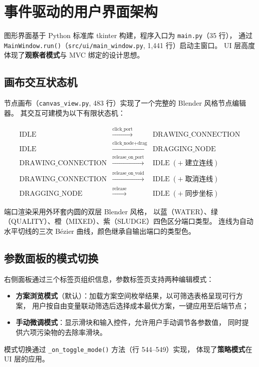 \documentclass[12pt,a4paper]{ctexart}
\theoremstyle{definition}
\theoremstyle{remark}
\begin{document}
\section{事件驱动的用户界面架构}

图形界面基于 Python 标准库 tkinter 构建，程序入口为 \texttt{main.py}（35 行），
通过 \texttt{MainWindow.run()}（\texttt{src/ui/main\_window.py}, 1,441 行）启动主窗口。
UI 层高度体现了\textbf{观察者模式}与 MVC 绑定的设计思想。

\subsection{画布交互状态机}

节点画布（\texttt{canvas\_view.py}, 483 行）实现了一个完整的 Blender 风格节点编辑器。
其交互可建模为以下有限状态机：

\[
\begin{array}{ccl}
\text{IDLE} & \xrightarrow{\text{click\_port}} & \text{DRAWING\_CONNECTION} \\
\text{IDLE} & \xrightarrow{\text{click\_node} + \text{drag}} & \text{DRAGGING\_NODE} \\
\text{DRAWING\_CONNECTION} & \xrightarrow{\text{release\_on\_port}} & \text{IDLE}\;(+\;\text{建立连线}) \\
\text{DRAWING\_CONNECTION} & \xrightarrow{\text{release\_on\_void}} & \text{IDLE}\;(+\;\text{取消连线}) \\
\text{DRAGGING\_NODE} & \xrightarrow{\text{release}} & \text{IDLE}\;(+\;\text{同步坐标})
\end{array}
\]

端口渲染采用外环套内圆的双层 Blender 风格，
以蓝（WATER）、绿（QUALITY）、橙（MIXED）、紫（SLUDGE）四色区分端口类型。
连线为自动水平切线的三次 Bézier 曲线，颜色继承自输出端口的类型色。

\subsection{参数面板的模式切换}

右侧面板通过三个标签页组织信息，参数标签页支持两种编辑模式：
\begin{itemize}
  \item \textbf{方案浏览模式}（默认）：加载方案空间枚举结果，以可筛选表格呈现可行方案，
        用户按自由变量联动筛选后选择成本最优方案，一键应用至后端节点；
  \item \textbf{手动微调模式}：显示滑块和输入控件，允许用户手动调节各参数值，
        同时提供六项污染物的去除率滑块。
\end{itemize}
模式切换通过 \texttt{\_on\_toggle\_mode()} 方法（行 544--549）实现，
体现了\textbf{策略模式}在 UI 层的应用。
\end{document}
